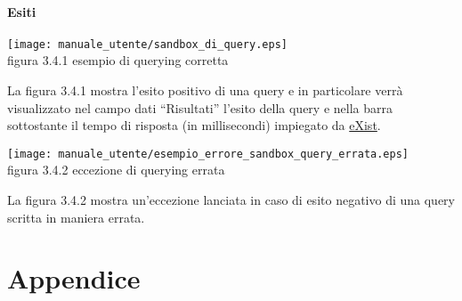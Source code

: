 \subsubsection{Esiti}
\begin{center}
\texttt{[image: manuale\_utente/sandbox\_di\_query.eps]}\\
 figura 3.4.1 esempio di querying corretta
\end{center}
La figura 3.4.1 mostra l'esito positivo di una query e in particolare verr\`a visualizzato nel campo dati ``Risultati'' l'esito della query e nella barra sottostante il tempo di risposta (in millisecondi) impiegato da \underline{eXist}. 

\begin{center}
\texttt{[image: manuale\_utente/esempio\_errore\_sandbox\_query\_errata.eps]}\\
figura 3.4.2 eccezione di querying errata
\end{center}
La figura 3.4.2 mostra un'eccezione lanciata in caso di esito negativo di una query scritta in maniera errata.

\chapter{Appendice}
